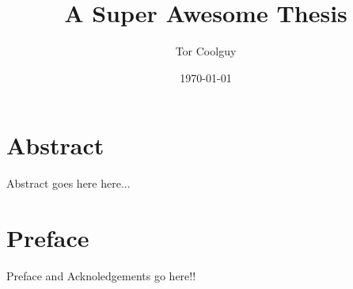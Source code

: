 \documentclass{dcthesis}
\title{A Super Awesome Thesis}
\author{Tor Coolguy}
\date{\today}
\theoremstyle{definition}
\theoremstyle{remark}
\begin{document}
\frontmatter

\maketitle

\chapter*{Abstract}
Abstract goes here here...

\chapter*{Preface}
Preface and Acknoledgements go here!!

\tableofcontents




\mainmatter


\backmatter

%
%

\end{document}
